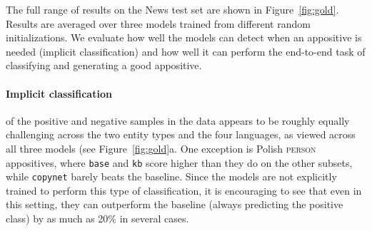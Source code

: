 \documentclass[11pt]{article}
\begin{document}
The full range of results on the News test set are shown in Figure~\ref{fig:gold}. Results are averaged over three models trained from different random initializations. We evaluate how well the models can detect when an appositive is needed (implicit classification) and how well it can perform the end-to-end task of classifying and generating a good appositive.

\paragraph{Implicit classification} of the positive and negative samples in the data appears to be roughly equally challenging across the two entity types and the four languages, as viewed across all three models (see Figure~\ref{fig:gold}a. One exception is Polish \textsc{person} appositives, where \texttt{base} and \texttt{kb} score higher than they do on the other subsets, while \texttt{copynet} barely beats the baseline. Since the models are not explicitly trained to perform this type of classification, it is encouraging to see that even in this setting, they can outperform the baseline (always predicting the positive class) by as much as 20\% in several cases.
\end{document}
